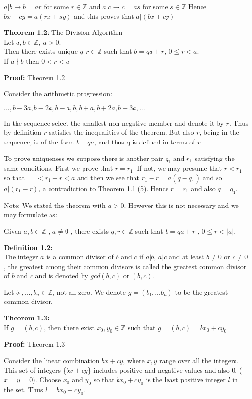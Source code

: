 \documentclass[a4paper]{article}
\begin{document}
$a|b \rightarrow b=ar$ for some $r\in \mathbb{Z}$
and $a|c \rightarrow c=as$ for some $s\in \mathbb{Z}$
Hence $bx+cy=a(rx+sy)$ and this proves that $a|(bx+cy)$


\textbf{Theorem 1.2:} The Division Algorithm\\
Let $a,b\in\mathbb{Z},\ a>0$.\\
Then there exists unique $q,r\in\mathbb{Z}$ such that $b=qa+r,\ 0\leq r<a$.\\
If $a\nmid b$ then $0<r<a$

\textbf{Proof:} Theorem 1.2

Consider the arithmetic progression:

$...,b-3a,b-2a,b-a,b,b+a,b+2a,b+3a,...$

In the sequence select the smallest non-negative member and denote it by
$r$. Thus by definition $r$ satisfies the inequalities of the theorem. But
also $r$, being in the sequence, is of the form $b-qa$, and thus q is defined
in terms of $r$.

To prove uniqueness we suppose there is another pair $q_1$ and $r_1$ satisfying
the same conditions. First we prove that $r=r_1$. If not, we may presume
that $r<r_1$ so that $=<r_1-r<a$ and then we see that $r_1-r=a(q-q_1)$ and
so $a|(r_1-r)$, a contradiction to Theorem 1.1 (5). Hence $r=r_1$ and also
$q=q_1$.

Note: We stated the theorem with $a>0$. However this is not necessary and
we may formulate as:

Given $a,b\in\mathbb{Z}$ , $a\neq 0$ , there exists $q,r\in\mathbb{Z}$ such
that $b=qa+r$ , $0\leq r < |a|$.


\textbf{Definition 1.2:}\\
The integer $a$ is a \underline{common divisor} of $b$ and $c$ if $a|b$,
$a|c$
and at least $b\neq0$ or $c\neq0$, the greatest among their common divisors
is
called the \underline{greatest common divisor} of $b$ and $c$ and is denoted
by
$gcd(b,c)$ or $(b,c)$.

Let $b_1,...,b_n\in\mathbb{Z}$, not all zero.
We denote $g=(b_1,...b_n)$ to be the greatest common divisor.

\textbf{Theorem 1.3:}\\
If $g=(b,c)$, then there exist $x_0,y_0\in\mathbb{Z}$ such that $g=(b,c)=bx_0+cy_0$

\textbf{Proof:} Theorem 1.3

Consider the linear combination $bx+cy$, where $x,y$ range over all the integers.
This set of integers \{$bx+cy$\} includes positive and negative values and
also 0. ($x=y=0$). Choose $x_0$ and $y_0$ so that $bx_0+cy_0$ is the least
positive integer $l$ in the set. Thus $l=bx_0+cy_0$.
\end{document}
